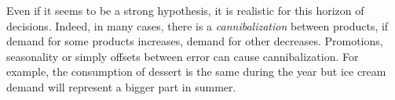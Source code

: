Even if it seems to be a strong hypothesis, it is realistic for this horizon of decisions.
Indeed, in many cases, there is a \emph{cannibalization} between products, \ie if demand for some products increases, demand for other decreases.
Promotions, seasonality or simply offsets between error can cause cannibalization.
For example, the consumption of dessert is the same during the year but ice cream demand will represent a bigger part in summer.



